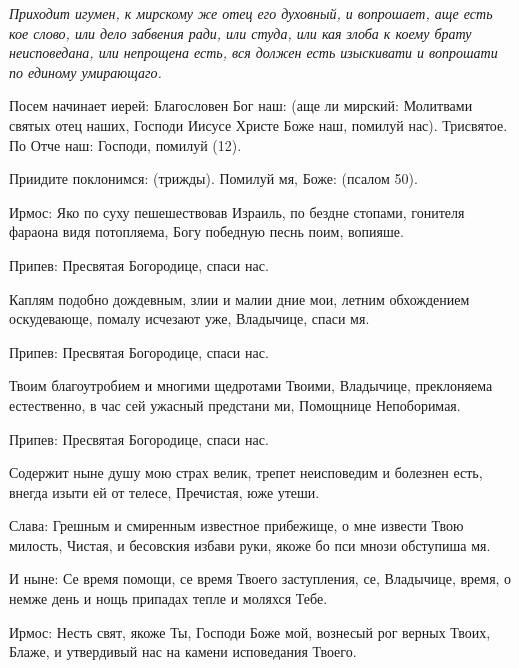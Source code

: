 \begin{mymulticols}
 


{\itshape Приходит игумен, к мирскому же отец его духовный, и вопрошает, аще есть кое слово, или дело забвения ради, или студа, или кая злоба к коему брату неисповедана, или непрощена есть, вся должен есть изыскивати и вопрошати по единому умирающаго.}


Посем начинает иерей: Благословен Бог наш: (аще ли мирский: Молитвами святых отец наших, Господи Иисусе Христе Боже наш, помилуй нас). Трисвятое. По Отче наш: Господи, помилуй (12).


Приидите поклонимся: (трижды). Помилуй мя, Боже: (псалом 50).




Ирмос: Яко по суху пешешествовав Израиль, по бездне стопами, гонителя фараона видя потопляема, Богу победную песнь поим, вопияше.





Припев: Пресвятая Богородице, спаси нас.


Каплям подобно дождевным, злии и малии дние мои, летним обхождением оскудевающе, помалу исчезают уже, Владычице, спаси мя.


Припев: Пресвятая Богородице, спаси нас.


Твоим благоутробием и многими щедротами Твоими, Владычице, преклоняема естественно, в час сей ужасный предстани ми, Помощнице Непоборимая.


Припев: Пресвятая Богородице, спаси нас.


Содержит ныне душу мою страх велик, трепет неисповедим и болезнен есть, внегда изыти ей от телесе, Пречистая, юже утеши.


Слава: Грешным и смиренным известное прибежище, о мне извести Твою милость, Чистая, и бесовския избави руки, якоже бо пси мнози обступиша мя.


И ныне: Се время помощи, се время Твоего заступления, се, Владычице, время, о немже день и нощь припадах тепле и моляхся Тебе.




Ирмос: Несть свят, якоже Ты, Господи Боже мой, вознесый рог верных Твоих, Блаже, и утвердивый нас на камени исповедания Твоего.






\end{mymulticols}
